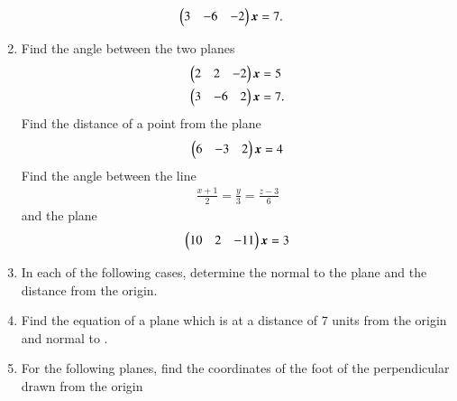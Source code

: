 \begin{enumerate}[label=\arabic*.,ref=\thesubsection.\theenumi]
\begin{align}
\\
\begin{pmatrix}3 &-6 & -2\end{pmatrix}\bm{x}&=7.
\end{align}
%
\item Find the angle between the two planes
\begin{align}
\begin{pmatrix}2 & 2 & -2\end{pmatrix}\bm{x}&=5
\\
\begin{pmatrix}3 &-6 & 2\end{pmatrix}\bm{x}&=7.
\end{align}
%
Find the distance of a point  from the plane
\begin{align}
\begin{pmatrix}6 & -3 & 2\end{pmatrix}\bm{x}=4
\end{align}
%
Find the angle between the line 
%
\begin{align}
\frac{x+1}{2} = \frac{y}{3} = \frac{z-3}{6} 
\end{align}
%
and
%
the plane 
\begin{align}
\begin{pmatrix}10 & 2 & -11\end{pmatrix}\bm{x}=3
\end{align}
%
\item In each of the following cases, determine the normal to the plane and the distance from the origin.
\begin{enumerate}[itemsep=2pt]
\end{enumerate}
\item Find the equation of a plane which is at a distance of 7 units from the origin and normal to .
%
\item  For the following planes, find the coordinates of the foot of the perpendicular drawn from the origin
\begin{enumerate}[itemsep=2pt]

\end{enumerate}
\end{enumerate}
